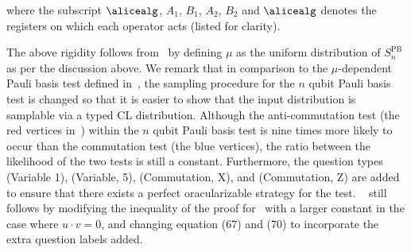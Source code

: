 \begin{theorem}

	where the subscript $\alicealg$, $A_1$, $B_1$, $A_2$, $B_2$ and $\alicealg$ denotes the registers on which each operator acts (listed for clarity). 
\end{theorem}


The above rigidity follows from~\cite[Theorem 6.4]{linTracialEmbeddableStrategies2024} by defining $\mu$ as the uniform distribution of $S^{\text{PB}}_n$ as per the discussion above. We remark that in comparison to the $\mu$-dependent Pauli basis test defined in~\cite[Figure 3]{linTracialEmbeddableStrategies2024}, the sampling procedure for the $n$ qubit Pauli basis test is changed so that it is easier to show that the input distribution is samplable via a typed CL distribution. Although the anti-commutation test (the red vertices in~) within the $n$ qubit Pauli basis test is nine times more likely to occur than the commutation test (the blue vertices), the ratio between the likelihood of the two tests is still a constant. Furthermore, the question types (Variable 1), (Variable, 5), (Commutation, X), and (Commutation, Z) are added to ensure that there exists a perfect oracularizable strategy for the test. ~ still follows by modifying the inequality of the proof for~\cite[Lemma B.1]{linTracialEmbeddableStrategies2024} with a larger constant in the case where $u \cdot v = 0$, and changing equation (67) and (70) to incorporate the extra question labels added. 


